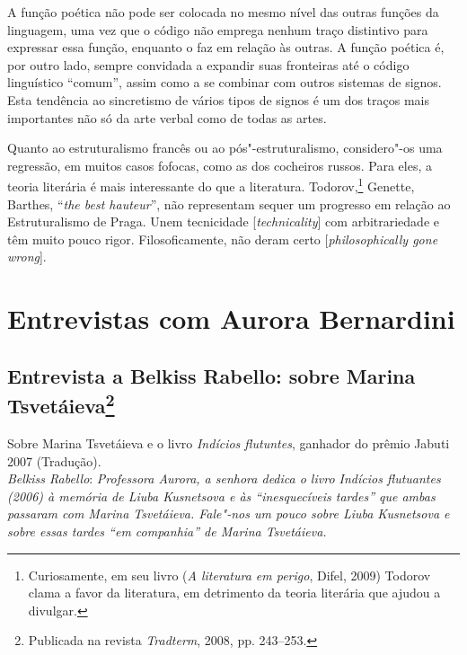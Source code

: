 {{{A função poética não pode ser colocada no mesmo nível das outras funções
da linguagem, uma vez que o código não emprega nenhum traço distintivo
para expressar essa função, enquanto o faz em relação às outras. A
função poética é, por outro lado, sempre convidada a expandir suas
fronteiras até o código linguístico ``comum'', assim como a se combinar
com outros sistemas de signos.
Esta tendência ao sincretismo de vários tipos de signos é um
dos traços mais importantes não só da arte verbal como de todas as artes.

Quanto ao estruturalismo francês ou ao pós"-estruturalismo, considero"-os
uma regressão, em muitos casos fofocas, como as dos cocheiros russos.
Para eles, a teoria literária é mais interessante do que a literatura.
Todorov,\footnote{Curiosamente, em seu livro (\emph{A literatura
em perigo}, Difel, 2009) Todorov clama a favor da literatura, em detrimento da
teoria literária que ajudou a divulgar.} Genette, Barthes, ``\emph{the best hauteur}'', não representam
sequer um progresso em relação ao Estruturalismo de Praga. Unem
tecnicidade [\emph{technicality}] com arbitrariedade e têm muito pouco
rigor. Filosoficamente, não deram certo [\emph{philosophically gone
wrong}].

\part{Entrevistas com Aurora Bernardini}

\chapter{Entrevista a Belkiss Rabello: sobre Marina Tsvetáieva\footnote{Publicada na revista
  \emph{Tradterm}, 2008, pp. 243--253.}}

Sobre Marina Tsvetáieva e o livro \emph{Indícios flutuntes}, ganhador do
prêmio Jabuti 2007 (Tradução). \\

\noindent
\emph{Belkiss Rabello}: \emph{Professora Aurora, a senhora dedica o
livro \emph{Indícios flutuantes} (2006) à memória de Liuba Kusnetsova e
às ``inesquecíveis tardes'' que ambas passaram com Marina Tsvetáieva.
Fale"-nos um pouco sobre Liuba Kusnetsova e sobre essas tardes ``em
companhia'' de Marina Tsvetáieva.}

}}}
